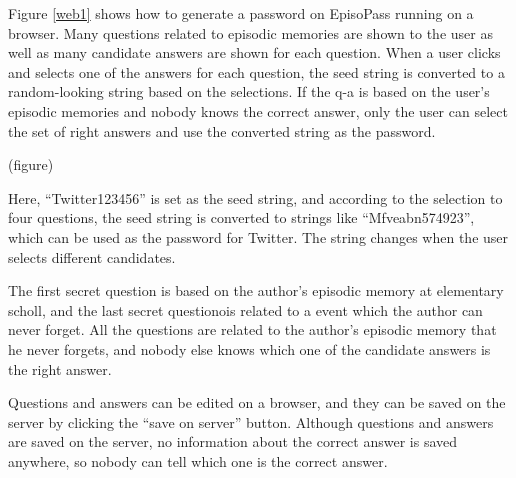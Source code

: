 \documentclass{article}
\begin{document}
Figure \ref{web1} shows how to generate a password
on EpisoPass running on a browser.
Many questions related to episodic memories are shown to the user
as well as many candidate answers are shown for each question.
When a user clicks and selects one of the answers for each question,
the seed string is converted to a random-looking string
based on the selections.
If the q-a is based on the user's episodic memories and
nobody knows the correct answer,
only the user can select the set of right answers and
use the converted string as the password.

(figure)

Here, ``\textsf{Twitter123456}'' is set as the seed string,
and according to the selection to four questions,
the seed string is converted to strings like
``\textsf{Mfveabn574923}'', which can be used as the password
for Twitter.
The string changes when the user selects different candidates.


The first secret question is based on the author's episodic memory
at elementary scholl,
and the last secret questionois related to a event which the author
can never forget.
All the questions are related to the author's episodic memory
that he never forgets, and nobody else knows which one of the
candidate answers is the right answer.


Questions and answers can be edited on a browser, and they can be
saved on the server by clicking the ``save on server'' button.
Although questions and answers are saved on the server,
no information about the correct answer is saved anywhere,
so nobody can tell which one is the correct answer.

\end{document}
